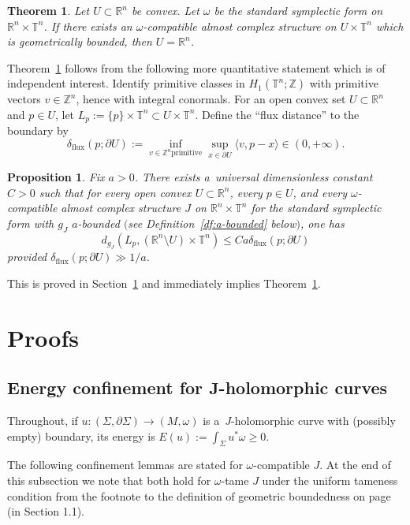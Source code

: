 \documentclass[10pt,a4paper]{amsart}
\numberwithin{equation}{section}
\newcommand{\bR}{{\mathbb R}}
\newcommand{\bZ}{{\mathbb Z}}
\newcommand{\bT}{{\mathbb T}}
\newtheorem{tm}[Theorem]{Theorem}
\newtheorem{Proposition}[Theorem]{Proposition}
\theoremstyle{definition}
\begin{document}
\begin{tm}\label{tm:2}
Let $U\subset \bR^n$ be convex.
Let $\omega$ be the standard symplectic form on $\bR^n\times\bT^n$. If there exists an $\omega$-compatible almost complex structure on $U\times\bT^n$ which is geometrically bounded, then $U=\bR^n$.
\end{tm}

Theorem~\ref{tm:2} follows from the following more quantitative statement which is of independent interest.
Identify primitive classes in $H_1(\bT^n;\bZ)$ with primitive vectors $v\in\bZ^n$, hence with integral conormals.
For an open convex set $U\subset\bR^n$ and $p\in U$, let $L_p := \{p\}\times \bT^n \subset U\times\bT^n$. Define the ``flux distance'' to the boundary by
\[
\delta_{\mathrm{flux}}(p;\partial U):=\inf_{v\in\bZ^n \mathrm{primitive}}\sup_{x\in \partial U}\langle v,p-x\rangle\in(0,+\infty).
\]

\begin{Proposition}\label{prop:flux-distance}
Fix $a>0$. There exists a~universal dimensionless constant $C>0$ such that for every open convex $U\subset\bR^n$, every $p\in U$, and every $\omega$-compatible almost complex structure $J$ on $\bR^n\times\bT^n$ for the standard symplectic form with $g_J$ $a$-bounded $($see Definition~{\rm\ref{df:a-bounded}} below$)$, one has
\[
 d_{g_J}(L_p, (\bR^n\setminus U)\times\bT^n)\leq Ca\delta_{\mathrm{flux}}(p;\partial U)
\]
provided $\delta_{\mathrm{flux}}(p;\partial U)\gg 1/a$.
\end{Proposition}
This is proved in Section~\ref{sec:proofs} and immediately implies Theorem~\ref{tm:2}.

\section{Proofs}\label{sec:proofs}

\subsection[Energy confinement for J-holomorphic curves]{Energy confinement for $\boldsymbol{J}$-holomorphic curves}
Throughout, if $u\colon (\Sigma,\partial\Sigma)\to (M,\omega)$ is a~$J$-holomorphic curve with (possibly empty) boundary, its energy is
$
E(u):=\int_{\Sigma} u^{*}\omega \ge 0$.


The following confinement lemmas are stated for $\omega$-compatible $J$. At the end of this subsection we note that both hold for $\omega$-tame $J$ under the uniform tameness condition from the footnote to the definition of geometric boundedness on page \pageref{tm:1} (in Section 1.1).
\end{document}
